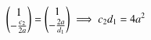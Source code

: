 \documentclass[journal,12pt,twocolumn]{IEEEtran}
\begin{document}
\begin{enumerate}[label=\arabic*]
\begin{align}
\begin{pmatrix}1\\-\frac{c_2}{2a}\end{pmatrix}&=\begin{pmatrix}1\\-\frac{2a}{d_1}\end{pmatrix}
\implies c_2d_1 = 4a^2
\end{align}



\end{enumerate}
\end{document}
